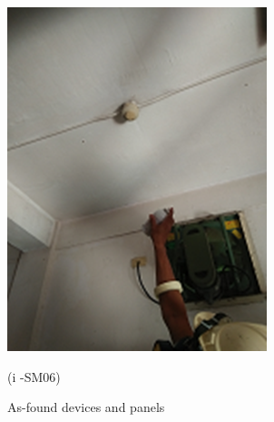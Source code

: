 \begin{figure}
\begin{minipage}[b]{0.2\linewidth}
		\includegraphics[width=\textwidth]{figures/fig_ch04_fdas_sm06}
	\caption*{(i -SM06)}
\end{minipage}
	\caption{As-found devices and panels}
	\label{ch04_fig_fdas01}
\end{figure}